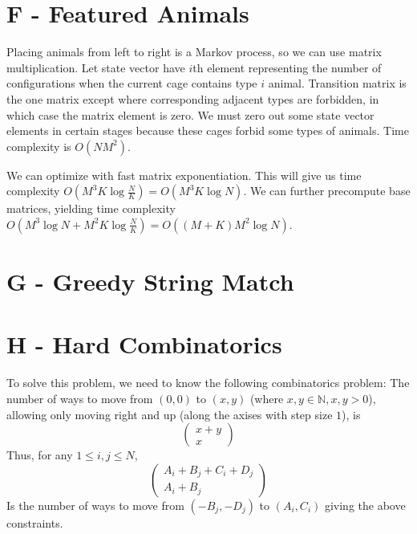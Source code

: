 \documentclass{article}
\begin{document}
\section*{F - Featured Animals}

Placing animals from left to right is a Markov process, so we can use matrix multiplication. Let state vector have $i$th element representing the number of configurations when the current cage contains type $i$ animal. Transition matrix is the one matrix except where corresponding adjacent types are forbidden, in which case the matrix element is zero. We must zero out some state vector elements in certain stages because these cages forbid some types of animals. Time complexity is $O(N M^2)$. 

We can optimize with fast matrix exponentiation. This will give us time complexity $O(M^3 K \log{\frac{N}{K}}) = O(M^3 K \log{N})$. We can further precompute base matrices, yielding time complexity $O(M^3 \log{N} + M^2 K \log{\frac{N}{K}}) = O((M+K) M^2 \log{N})$. 

\section*{G - Greedy String Match}



\section*{H - Hard Combinatorics}
To solve this problem, we need to know the following combinatorics problem: The number of ways to move from $(0, 0)$ to $(x, y)$ (where $x, y \in \mathbb{N}, x, y > 0$), 
allowing only moving right and up (along the axises with
step size $1$), is
\begin{equation}
\begin{pmatrix}
x + y\\
x
\end{pmatrix}
\end{equation}
Thus, for any $1 \leq i, j \leq N$,
\begin{equation}
\begin{pmatrix}
A_i + B_j + C_i + D_j\\
A_i + B_j
\end{pmatrix}
\end{equation}
Is the number of ways to move from $(-B_j, -D_j)$ to $(A_i, C_i)$ giving the above constraints.\\
\end{document}
